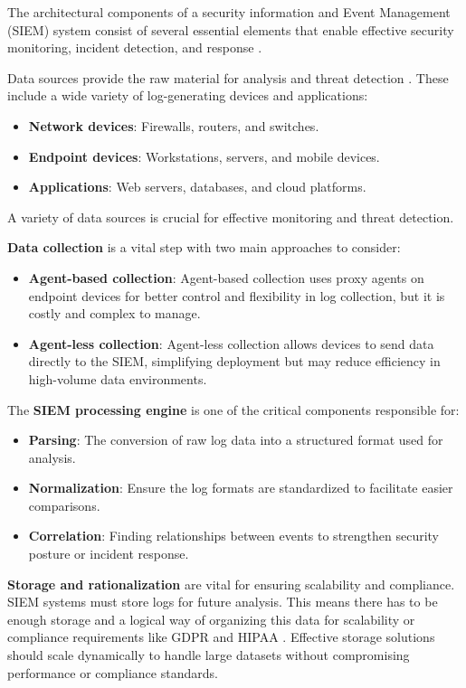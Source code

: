 The architectural components of a security information and Event Management (SIEM) system consist of several essential elements that enable effective security monitoring, incident detection, and response \parencite{Sheeraz2023}.

Data sources provide the raw material for analysis and threat detection \parencite{Ali2024}. These include a wide variety of log-generating devices and applications:
\begin{itemize}
    \item \textbf{Network devices}: Firewalls, routers, and switches.
    \item \textbf{Endpoint devices}: Workstations, servers, and mobile devices.
    \item \textbf{Applications}: Web servers, databases, and cloud platforms.
\end{itemize}

A variety of data sources is crucial for effective monitoring and threat detection. 

\textbf{Data collection} is a vital step with two main approaches to consider:
\begin{itemize}
    \item \textbf{Agent-based collection}: Agent-based collection uses proxy agents on endpoint devices for better control and flexibility in log collection, but it is costly and complex to manage.
    \item \textbf{Agent-less collection}: Agent-less collection allows devices to send data directly to the SIEM, simplifying deployment but may reduce efficiency in high-volume data environments.
\end{itemize}

The \textbf{SIEM processing engine} is one of the critical components \parencite{Sheeraz2023} responsible for:
\begin{itemize}
    \item \textbf{Parsing}: The conversion of raw log data into a structured format used for analysis.
    \item \textbf{Normalization}: Ensure the log formats are standardized to facilitate easier comparisons.
    \item \textbf{Correlation}: Finding relationships between events to strengthen security posture or incident response.
\end{itemize}

\textbf{Storage and rationalization} are vital for ensuring scalability and compliance. SIEM systems must store logs for future analysis.
This means there has to be enough storage and a logical way of organizing this data for scalability or compliance requirements like GDPR and HIPAA \parencite{Sheeraz2023}.
Effective storage solutions should scale dynamically to handle large datasets without compromising performance or compliance standards.


